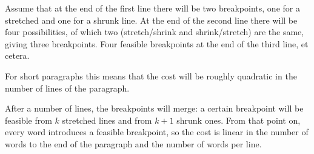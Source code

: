 Assume that at the end of the first line there will be two
breakpoints, one for a stretched and one for a shrunk line. At the end
of the second line there will be four possibilities, of which two
(stretch/shrink and shrink/stretch) are the same, giving three
breakpoints. Four feasible breakpoints at the end of the third line,
et cetera.

For short paragraphs this means that the cost will be roughly
quadratic in the number of lines of the paragraph.

After a number of lines, the breakpoints will merge: a certain breakpoint
will be feasible from $k$ stretched lines and from $k+1$ shrunk
ones. From that point on, every word introduces a feasible breakpoint,
so the cost is linear in the number of words to the end of the
paragraph and the number of words per line.
